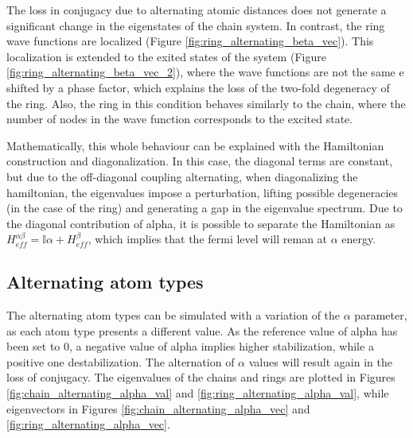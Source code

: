 \documentclass{article}
\begin{document}
The loss in conjugacy due to alternating atomic distances does not generate a significant change in the eigenstates of the chain system. In contrast, the ring wave functions are localized (Figure \ref{fig:ring_alternating_beta_vec}). This localization is extended to the exited states of the system (Figure \ref{fig:ring_alternating_beta_vec_2}), where the wave functions are not the same e shifted by a phase factor, which explains the loss of the two-fold degeneracy of the ring.  Also, the ring in this condition behaves similarly to the chain, where the number of nodes in the wave function corresponds to the excited state.

Mathematically, this whole behaviour can be explained with the Hamiltonian construction and diagonalization. In this case, the diagonal terms are constant, but due to the off-diagonal coupling alternating, when diagonalizing the hamiltonian, the eigenvalues impose a perturbation, lifting possible degeneracies (in the case of the ring) and generating a gap in the eigenvalue spectrum. Due to the diagonal contribution of alpha, it is possible to separate the Hamiltonian as $H_{eff}^{\alpha\beta} = \mathbb{I} \alpha + H_{eff}^\beta$, which implies that the fermi level will reman at $\alpha$ energy. 

\subsection{Alternating atom types}
The alternating atom types can be simulated with a variation of the $\alpha$ parameter, as each atom type presents a different value. As the reference value of alpha has been set to $0$, a negative value of alpha implies higher stabilization, while a positive one destabilization. The alternation of $\alpha$ values will result again in the loss of conjugacy. The eigenvalues of the chains and rings are plotted in Figures \ref{fig:chain_alternating_alpha_val} and \ref{fig:ring_alternating_alpha_val}, while eigenvectors in Figures \ref{fig:chain_alternating_alpha_vec} and \ref{fig:ring_alternating_alpha_vec}.
\end{document}
